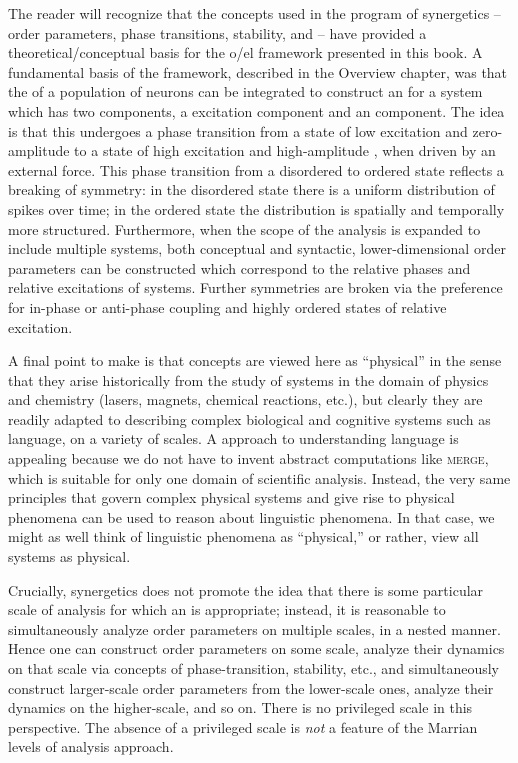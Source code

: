   The reader will recognize that the concepts used in the program of synergetics -- order parameters, phase transitions, stability, and  -- have provided a theoretical/conceptual basis for the o/el framework presented in this book. A fundamental basis of the framework, described in the Overview chapter, was that the  of a population of neurons can be integrated to construct an  for a system which has two components, a excitation component and an  component. The idea is that this  undergoes a phase transition from a state of low excitation and zero-amplitude  to a state of high excitation and high-amplitude , when driven by an external force. This phase transition from a disordered to ordered state reflects a breaking of symmetry: in the disordered state there is a uniform distribution of spikes over time; in the ordered state the distribution is spatially and temporally more structured. Furthermore, when the scope of the analysis is expanded to include multiple systems, both conceptual and syntactic, lower-di\-men\-sional order parameters can be constructed which correspond to the relative phases and relative excitations of systems. Further symmetries are broken via the preference for in-phase or anti-phase coupling and highly ordered states of relative excitation.

A final point to make is that  concepts are viewed here as “physical” in the sense that they arise historically from the study of systems in the domain of physics and chemistry (lasers, magnets, chemical reactions, etc.), but clearly they are readily adapted to describing complex biological and cognitive systems such as language, on a variety of scales. A  approach to understanding language is appealing because we do not have to invent abstract computations like \textsc{merge}, which is suitable for only one domain of scientific analysis. Instead, the very same principles that govern complex physical systems and give rise to physical phenomena can be used to reason about linguistic phenomena. In that case, we might as well think of linguistic phenomena as “physical,” or rather, view all systems as physical.

 Crucially, synergetics does not promote the idea that there is some particular scale of analysis for which an  is appropriate; instead, it is reasonable to simultaneously analyze order parameters on multiple scales, in a nested manner. Hence one can construct order parameters on some scale, analyze their dynamics on that scale via concepts of phase-transition, stability, etc., and simultaneously construct larger-scale order parameters from the lower-scale ones, analyze their dynamics on the higher-scale, and so on. There is no privileged scale in this perspective. The absence of a privileged scale is \textit{not} a feature of the Marrian levels of analysis approach.

